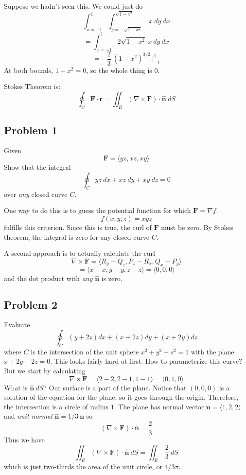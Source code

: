 \documentclass[11pt, oneside]{article}
\begin{document}
Suppose we hadn't seen this.  We could just do
\[ \int_{x=-1}^{1} \int_{y=-\sqrt{1-x^2}}^{\sqrt{1-x^2}} \ x \ dy \ dx \]
\[ = \int_{x=-1}^{1} 2 \sqrt{1-x^2} \ x \ dy \ dx \]
\[ = - \frac{2}{3} \ (1-x^2)^{3/2} \ \bigg |_{-1}^1 \]
At both bounds, $1-x^2 = 0$, so the whole thing is $0$.

Stokes Theorem is:
\[ \oint_C \mathbf{F} \cdot \mathbf{r} = \iint_R (\nabla \times \mathbf{F}) \cdot \hat{\mathbf{n}} \ dS \]

\subsection*{Problem 1}

Given 
\[ \mathbf{F} = \langle yz,xz,xy \rangle \]
Show that the integral
\[ \oint_C yz \ dx + xz \ dy + xy \ dz = 0 \]
over \emph{any} closed curve $C$.

One way to do this is to guess the potential function for which $\mathbf{F} = \nabla f$.
\[ f(x,y,z) = xyz \]
fulfills this criterion.  Since this is true, the curl of $\mathbf{F}$ must be zero.  By Stokes theorem, the integral is zero for any closed curve $C$.

A second approach is to actually calculate the curl
\[ \nabla \times \mathbf{F} = \langle R_y - Q_z, P_z - R_x, Q_x - P_y \rangle \]
\[ = \langle x - x, y - y, z - z \rangle = \langle 0, 0, 0 \rangle \]
and the dot product with \emph{any} $\hat{\mathbf{n}}$ is zero.

\subsection*{Problem 2}
Evaluate
\[ \oint_C (y + 2z)dx + (x + 2z)dy + (x + 2y)dz \]
where $C$ is the intersection of the unit sphere $x^2 + y^2 + z^2 = 1$ with the plane $x + 2y + 2z = 0$.  This looks fairly hard at first.  How to parameterize this curve?  But we start by calculating
\[ \nabla \times \mathbf{F} = \langle 2 - 2, 2 - 1, 1 - 1 \rangle = \langle 0, 1, 0 \rangle  \]
What is $\hat{\mathbf{n}} \ dS$?  Our surface is a part of the plane.  Notice that $(0,0,0)$ is a solution of the equation for the plane, so it goes through the origin.  Therefore, the intersection is a circle of radius $1$.  The plane has normal vector $\mathbf{n} = \langle 1,2,2 \rangle$ and \emph{unit normal} $\hat{\mathbf{n}} = 1/3 \ \mathbf{n}$ so
\[ (\nabla \times \mathbf{F} ) \cdot \hat{\mathbf{n}} = \frac{2}{3} \]
Thus we have 
\[ \iint_R (\nabla \times \mathbf{F}) \cdot \hat{\mathbf{n}} \ dS =  \iint_R \ \frac{2}{3} \ dS \]
which is just two-thirds the area of the unit circle, or $4/3 \pi$.
\end{document}

